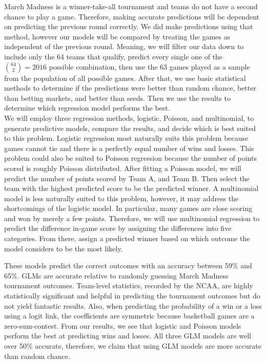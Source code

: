 \documentclass[
  man,floatsintext]{apa6}
\begin{document}
March Madness is a winner-take-all tournament and teams do not have a second chance to play a game. Therefore, making accurate predictions will be dependent on predicting the previous round correctly. We did make predictions using that method, however our models will be compared by treating the games as independent of the previous round. Meaning, we will filter our data down to include only the 64 teams that qualify, predict every single one of the \({64\choose 2} = 2016\) possible combination, then use the 63 games played as a sample from the population of all possible games. After that, we use basic statistical methods to determine if the predictions were better than random chance, better than betting markets, and better than seeds. Then we use the results to determine which regression model performs the best.\\
We will employ three regression methods, logistic, Poisson, and multinomial, to generate predictive models, compare the results, and decide which is best suited to this problem. Logistic regression most naturally suits this problem because games cannot tie and there is a perfectly equal number of wins and losses. This problem could also be suited to Poisson regression because the number of points scored is roughly Poisson distributed. After fitting a Poisson model, we will predict the number of points scored by Team A, and Team B. Then select the team with the highest predicted score to be the predicted winner. A multinomial model is less naturally suited to this problem, however, it may address the shortcomings of the logistic model. In particular, many games are close scoring and won by merely a few points. Therefore, we will use multinomial regression to predict the difference in-game score by assigning the differences into five categories. From there, assign a predicted winner based on which outcome the model considers to be the most likely.

These models predict the correct outcomes with an accuracy between 59\% and 65\%. GLMs are accurate relative to randomly guessing March Madness tournament outcomes. Team-level statistics, recorded by the NCAA, are highly statistically significant and helpful in predicting the tournament outcomes but do not yield fantastic results. Also, when predicting the probability of a win or a loss using a logit link, the coefficients are symmetric because basketball games are a zero-sum-contest. From our results, we see that logistic and Poisson models perform the best at predicting wins and losses. All three GLM models are well over 50\% accurate, therefore, we claim that using GLM models are more accurate than random chance.
\end{document}
